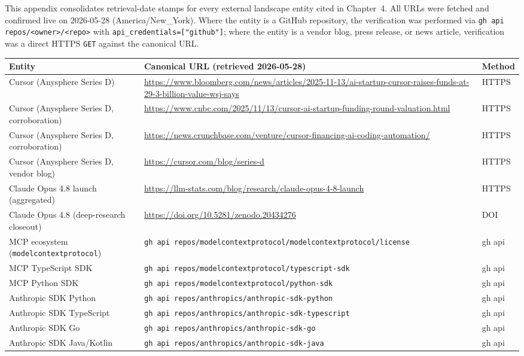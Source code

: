 This appendix consolidates retrieval-date stamps for every external
landscape entity cited in Chapter~4.  All URLs were fetched and confirmed
live on 2026-05-28 (America/New\_York).  Where the entity is a GitHub
repository, the verification was performed via
\texttt{gh api repos/<owner>/<repo>} with
\texttt{api\_credentials=["github"]}; where the entity is a vendor blog,
press release, or news article, verification was a direct HTTPS \texttt{GET}
against the canonical URL.

\begin{center}
\small
\begin{tabular}{p{4.0cm}p{8.5cm}p{2.0cm}}
\textbf{Entity} & \textbf{Canonical URL (retrieved 2026-05-28)} & \textbf{Method} \\
\hline
Cursor (Anysphere Series D) & \url{https://www.bloomberg.com/news/articles/2025-11-13/ai-startup-cursor-raises-funds-at-29-3-billion-value-wsj-says} & HTTPS \\
Cursor (Anysphere Series D, corroboration) & \url{https://www.cnbc.com/2025/11/13/cursor-ai-startup-funding-round-valuation.html} & HTTPS \\
Cursor (Anysphere Series D, corroboration) & \url{https://news.crunchbase.com/venture/cursor-financing-ai-coding-automation/} & HTTPS \\
Cursor (Anysphere Series D, vendor blog) & \url{https://cursor.com/blog/series-d} & HTTPS \\
Claude Opus 4.8 launch (aggregated) & \url{https://llm-stats.com/blog/research/claude-opus-4-8-launch} & HTTPS \\
Claude Opus 4.8 (deep-research closeout) & \url{https://doi.org/10.5281/zenodo.20434276} & DOI \\
MCP ecosystem (\texttt{modelcontextprotocol}) & \texttt{gh api repos/modelcontextprotocol/modelcontextprotocol/license} & gh api \\
MCP TypeScript SDK & \texttt{gh api repos/modelcontextprotocol/typescript-sdk} & gh api \\
MCP Python SDK & \texttt{gh api repos/modelcontextprotocol/python-sdk} & gh api \\
Anthropic SDK Python & \texttt{gh api repos/anthropics/anthropic-sdk-python} & gh api \\
Anthropic SDK TypeScript & \texttt{gh api repos/anthropics/anthropic-sdk-typescript} & gh api \\
Anthropic SDK Go & \texttt{gh api repos/anthropics/anthropic-sdk-go} & gh api \\
Anthropic SDK Java/Kotlin & \texttt{gh api repos/anthropics/anthropic-sdk-java} & gh api \\

\end{tabular}
\end{center}
